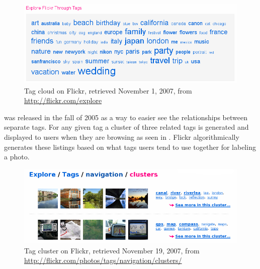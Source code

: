 \begin{figure}
  \begin{whole}
    \includegraphics[width=\wholewidth]{scrsh_flickr_tagcloud}
    \caption[Flickr Tag Cloud]{%
       Tag cloud on Flickr,
       retrieved November 1, 2007, from \url{http://flickr.com/explore}}
    \label{figure:scrsh.flickr.tagcloud}
  \end{whole}
\end{figure}

 was released in the fall of 2005 \citep{butterfield05}
as a way to easier see the relationships between separate tags. For any given
tag a cluster of three related tags is generated and displayed
 to users when
they are browsing as seen in .
Flickr algorithmically generates these listings based on what tags users tend
to use together for labeling a photo.

\begin{figure}
  \begin{whole}
    \includegraphics[width=\wholewidth]{scrsh_flickr_tagcluster}
    \caption[Flickr Tag Cluster]{%
       Tag cluster on Flickr,
       retrieved November 19, 2007, from
       \url{http://flickr.com/photos/tags/navigation/clusters/}}
    \label{figure:scrsh.flickr.tagcluster}
  \end{whole}
\end{figure}

